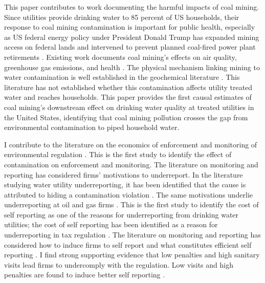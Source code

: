 \documentclass[12pt]{article}
\begin{document}
This paper contributes to work documenting the harmful impacts of coal mining. Since utilities provide drinking water to 85 percent of US households, their response to coal mining contamination is important for public health, especially as US federal energy policy under President Donald Trump has expanded mining access on federal lands and intervened to prevent planned coal-fired power plant retirements \parencite{Trump2025EO14260,Trump2025EO14261,Trump2025Proc10914,Daly2025CoalMining}. Existing work documents coal mining's effects on air quality, greenhouse gas emissions, and health \parencite{muller2011environmental,parfitt2024there}. The physical mechanism linking mining to water contamination is well established in the geochemical literature \parencite{skousen2019acid,akcil2006acid,ceto2000abandoned,rouhani2023overview,liang2017spatial,boente2020benzo}. This literature has not established whether this contamination affects utility treated water and reaches households. This paper provides the first causal estimates of coal mining's downstream effect on drinking water quality at treated utilities in the United States, identifying that coal mining pollution crosses the gap from environmental contamination to piped household water.

I contribute to the literature on the economics of enforcement and monitoring of environmental regulation \parencite{shimshack2014economics}. This is the first study to identify the effect of contamination on enforcement and monitoring. The literature on monitoring and reporting has considered firms' motivations to underreport. In the literature studying water utility underreporting, it has been identified that the cause is attributed to hiding a contamination violation \parencite{bennear2009sampling, naylor5537637strategic, andarge2025quantifying}. The same motivations underlie underreporting at oil and gas firms \parencite{lee2020essays}. This is the first study to identify the cost of self reporting as one of the reasons for underreporting from drinking water utilities; the cost of self reporting has been identified as a reason for underreporting in tax regulation \parencite{tazhitdinova2018reducing}. The literature on monitoring and reporting has considered how to induce firms to self report and what constitutes efficient self reporting \parencite{innes1999remediation}. I find strong supporting evidence that low penalties and high sanitary visits lead firms to undercomply with the regulation. Low visits and high penalties are found to induce better self reporting \parencite{malik1993self}. 
\end{document}
